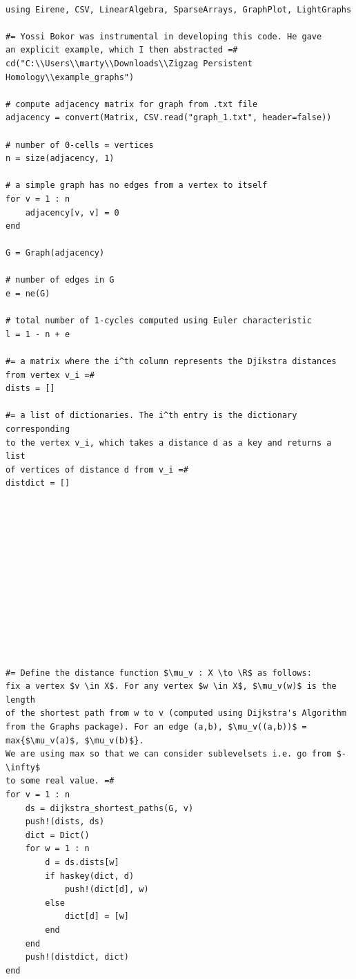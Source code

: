 \documentclass[12pt,a4paper]{amsart}
\numberwithin{equation}{section}
\def\R{{\mathbb R}}
\theoremstyle{plain}
\theoremstyle{definition}
\begin{document}
\begin{lstlisting}[mathescape=true]

using Eirene, CSV, LinearAlgebra, SparseArrays, GraphPlot, LightGraphs

#= Yossi Bokor was instrumental in developing this code. He gave
an explicit example, which I then abstracted =#
cd("C:\\Users\\marty\\Downloads\\Zigzag Persistent Homology\\example_graphs")

# compute adjacency matrix for graph from .txt file
adjacency = convert(Matrix, CSV.read("graph_1.txt", header=false))

# number of 0-cells = vertices
n = size(adjacency, 1)

# a simple graph has no edges from a vertex to itself
for v = 1 : n
    adjacency[v, v] = 0
end

G = Graph(adjacency)

# number of edges in G
e = ne(G)

# total number of 1-cycles computed using Euler characteristic
l = 1 - n + e

#= a matrix where the i^th column represents the Djikstra distances 
from vertex v_i =#
dists = []

#= a list of dictionaries. The i^th entry is the dictionary corresponding 
to the vertex v_i, which takes a distance d as a key and returns a list
of vertices of distance d from v_i =#
distdict = []













#= Define the distance function $\mu_v : X \to \R$ as follows:
fix a vertex $v \in X$. For any vertex $w \in X$, $\mu_v(w)$ is the length
of the shortest path from w to v (computed using Dijkstra's Algorithm
from the Graphs package). For an edge (a,b), $\mu_v((a,b))$ = max{$\mu_v(a)$, $\mu_v(b)$}.
We are using max so that we can consider sublevelsets i.e. go from $-\infty$
to some real value. =#
for v = 1 : n
    ds = dijkstra_shortest_paths(G, v)
    push!(dists, ds)
    dict = Dict()
    for w = 1 : n
        d = ds.dists[w]
        if haskey(dict, d)
            push!(dict[d], w)
        else
            dict[d] = [w]
        end
    end
    push!(distdict, dict)
end


\end{lstlisting}
\end{document}
